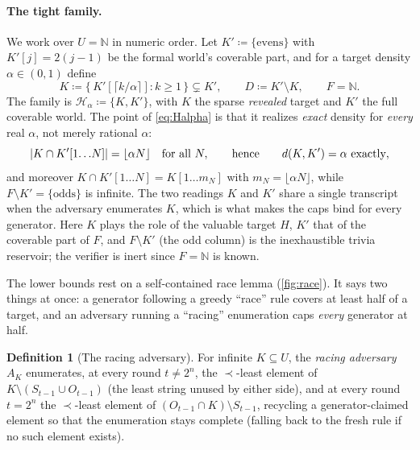 \documentclass[11pt]{article}
\numberwithin{equation}{section}
\newcommand{\N}{\mathbb{N}}
\newcommand{\mc}[1]{\mathcal{#1}}
\newcommand{\defeq}{\coloneqq}
\DeclarePairedDelimiter{\abs}{\lvert}{\rvert}
\newcommand{\gnd}{U}
\newcommand{\Amb}{F}
\newcommand{\Val}{H}
\newcommand{\Hcal}{\mc{H}}
\newcommand{\Hfam}{\Hcal_{\alpha}}
\newcommand{\Seen}{S}
\newcommand{\Out}{O}
\newcommand{\dens}[2]{d(#1,#2)}
\newcommand{\rest}[2]{#1[1\!\dots\! #2]}
\theoremstyle{plain}
\theoremstyle{definition}
\newtheorem{definition}[theorem]{Definition}
\theoremstyle{remark}
\begin{document}
\paragraph{The tight family.}
We work over $\gnd = \N$ in numeric order. Let $K' \defeq \{\text{evens}\}$ with $K'[j] =
2(j-1)$ be the formal world's coverable part, and for a target density $\alpha \in (0,1)$
define
\begin{equation}\label{eq:Halpha}
  K \defeq \{\, K'[\lceil k/\alpha \rceil] : k \ge 1 \,\}
  \subsetneq K' , \qquad
  D \defeq K' \setminus K , \qquad \Amb = \N .
\end{equation}
The family is $\Hfam \defeq \{K, K'\}$, with $K$ the sparse \emph{revealed} target and $K'$
the full coverable world. The point of \eqref{eq:Halpha} is that it realizes \emph{exact}
density for \emph{every} real $\alpha$, not merely rational $\alpha$:
\begin{equation}\label{eq:exactdensity}
  \abs{K \cap \rest{K'}{N}} = \lfloor \alpha N \rfloor
  \quad\text{for all } N, \qquad\text{hence}\qquad \dens{K}{K'} = \alpha \text{ exactly},
\end{equation}
and moreover $K \cap \rest{K'}{N} = \rest{K}{m_N}$ with $m_N = \lfloor \alpha N \rfloor$,
while $\Amb \setminus K' = \{\text{odds}\}$ is infinite. The two readings $K$ and $K'$ share a
single transcript when the adversary enumerates $K$, which is what makes the caps bind for
every generator. Here $K$ plays the role of the valuable target $\Val$, $K'$ that of the
coverable part of $\Amb$, and $\Amb \setminus K'$ (the odd column) is the inexhaustible trivia
reservoir; the verifier is inert since $\Amb = \N$ is known.

The lower bounds rest on a self-contained race lemma (\cref{fig:race}). It says two things at
once: a generator following a greedy ``race'' rule covers at least half of a target, and an
adversary running a ``racing'' enumeration caps \emph{every} generator at half.


\begin{definition}[The racing adversary]\label{def:racingadv}
For infinite $K \subseteq \gnd$, the \emph{racing adversary} $A_K$ enumerates, at every round
$t \ne 2^n$, the $\prec$-least element of $K \setminus (\Seen_{t-1} \cup \Out_{t-1})$ (the
least string unused by either side), and at every round $t = 2^n$ the $\prec$-least element of
$(\Out_{t-1} \cap K) \setminus \Seen_{t-1}$, recycling a generator-claimed element so that the
enumeration stays complete (falling back to the fresh rule if no such element exists).
\end{definition}
\end{document}
